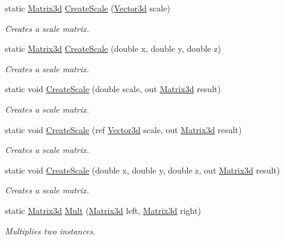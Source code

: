\begin{DoxyCompactItemize}
static \hyperlink{struct_open_t_k_1_1_matrix3d}{Matrix3d} \hyperlink{struct_open_t_k_1_1_matrix3d_aef3b401f35958630c5f283cdbb7767f5}{Create\-Scale} (\hyperlink{struct_open_t_k_1_1_vector3d}{Vector3d} scale)
\begin{DoxyCompactList}\small\item\em Creates a scale matrix. \end{DoxyCompactList}\item 
static \hyperlink{struct_open_t_k_1_1_matrix3d}{Matrix3d} \hyperlink{struct_open_t_k_1_1_matrix3d_afce1f043488c61ceacae7d70126c649d}{Create\-Scale} (double x, double y, double z)
\begin{DoxyCompactList}\small\item\em Creates a scale matrix. \end{DoxyCompactList}\item 
static void \hyperlink{struct_open_t_k_1_1_matrix3d_a255c7cc5e4bfa2fb6b1b603f2e4e5e55}{Create\-Scale} (double scale, out \hyperlink{struct_open_t_k_1_1_matrix3d}{Matrix3d} result)
\begin{DoxyCompactList}\small\item\em Creates a scale matrix. \end{DoxyCompactList}\item 
static void \hyperlink{struct_open_t_k_1_1_matrix3d_aea501aa881b723cc2a5f46116167b322}{Create\-Scale} (ref \hyperlink{struct_open_t_k_1_1_vector3d}{Vector3d} scale, out \hyperlink{struct_open_t_k_1_1_matrix3d}{Matrix3d} result)
\begin{DoxyCompactList}\small\item\em Creates a scale matrix. \end{DoxyCompactList}\item 
static void \hyperlink{struct_open_t_k_1_1_matrix3d_afddff62793ba8b4905314ac36fb18de0}{Create\-Scale} (double x, double y, double z, out \hyperlink{struct_open_t_k_1_1_matrix3d}{Matrix3d} result)
\begin{DoxyCompactList}\small\item\em Creates a scale matrix. \end{DoxyCompactList}\item 
static \hyperlink{struct_open_t_k_1_1_matrix3d}{Matrix3d} \hyperlink{struct_open_t_k_1_1_matrix3d_a13606c4a84f20d7c779519ee561fa65b}{Mult} (\hyperlink{struct_open_t_k_1_1_matrix3d}{Matrix3d} left, \hyperlink{struct_open_t_k_1_1_matrix3d}{Matrix3d} right)
\begin{DoxyCompactList}\small\item\em Multiplies two instances. \end{DoxyCompactList}\item 

\end{DoxyCompactItemize}
